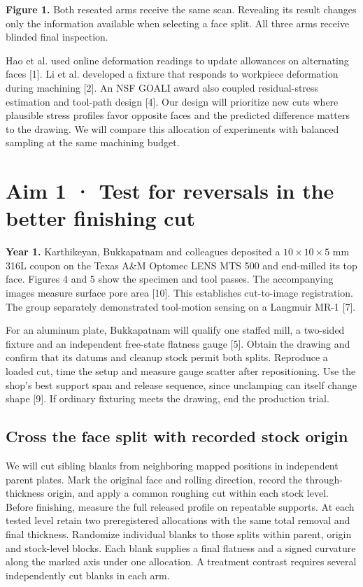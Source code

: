 \documentclass[11pt,letterpaper]{article}
\begin{document}
{\small\textbf{Figure 1.} Both reseated arms receive the same scan. Revealing its result changes only the information available when selecting a face split. All three arms receive blinded final inspection.}

Hao et al. used online deformation readings to update allowances on alternating faces [1]. Li et al. developed a fixture that responds to workpiece deformation during machining [2]. An NSF GOALI award also coupled residual-stress estimation and tool-path design [4]. Our design will prioritize new cuts where plausible stress profiles favor opposite faces and the predicted difference matters to the drawing. We will compare this allocation of experiments with balanced sampling at the same machining budget.

\newpage

\section*{Aim 1 · Test for reversals in the better finishing cut}

\textbf{Year 1.} Karthikeyan, Bukkapatnam and colleagues deposited a $10\times10\times5$ mm 316L coupon on the Texas A\&M Optomec LENS MTS 500 and end-milled its top face. Figures 4 and 5 show the specimen and tool passes. The accompanying images measure surface pore area [10]. This establishes cut-to-image registration. The group separately demonstrated tool-motion sensing on a Langmuir MR-1 [7].

For an aluminum plate, Bukkapatnam will qualify one staffed mill, a two-sided fixture and an independent free-state flatness gauge [5]. Obtain the drawing and confirm that its datums and cleanup stock permit both splits. Reproduce a loaded cut, time the setup and measure gauge scatter after repositioning. Use the shop's best support span and release sequence, since unclamping can itself change shape [9]. If ordinary fixturing meets the drawing, end the production trial.

\subsection*{Cross the face split with recorded stock origin}

We will cut sibling blanks from neighboring mapped positions in independent parent plates. Mark the original face and rolling direction, record the through-thickness origin, and apply a common roughing cut within each stock level. Before finishing, measure the full released profile on repeatable supports. At each tested level retain two preregistered allocations with the same total removal and final thickness. Randomize individual blanks to those splits within parent, origin and stock-level blocks. Each blank supplies a final flatness and a signed curvature along the marked axis under one allocation. A treatment contrast requires several independently cut blanks in each arm.
\end{document}
